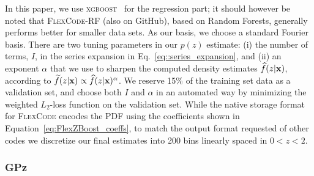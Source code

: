 In this paper, we use \textsc{xgboost}~\citep{Chen:16} for the regression part; it should however be noted that \textsc{FlexCode-RF} (also on GitHub), based on Random Forests, generally performs better for smaller data sets.
As our basis, we choose a standard Fourier basis.
There are two tuning parameters in our $p(z)$ estimate: (i) the number of terms, $I$, in the series expansion in Eq.~\ref{eq::series_expansion}, and (ii) an exponent $\alpha$ that we use to sharpen the computed density estimates $\widehat{f}(z|{\mathbf{x}})$, according to $\widetilde{f}(z|{\mathbf{x}}) \propto \widehat{f}(z|{\mathbf{x}})^\alpha$.
We reserve 15\% of the training set data as a validation set, and choose both $I$ and $\alpha$ in an automated way by minimizing the weighted $L_2$-loss function \citep[Eq. 5 in][]{Izbicki:17} on the  validation set.
While the native storage format for \textsc{FlexCode} encodes the PDF using the coefficients shown in Equation~\ref{eq:FlexZBoost_coeffs}, to match the output format requested of other codes we discretize our final estimates into 200 bins linearly spaced in $0 < z < 2$.





%
%

\subsubsection{GPz}
\label{sec:gpz}

